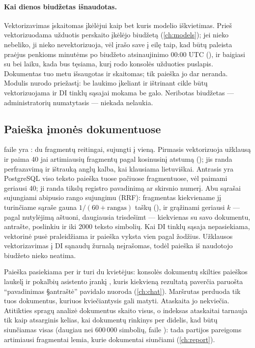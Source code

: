\paragraph{Kai dienos biudžetas išnaudotas.} Vektorizavimas įskaitomas įkėlėjui kaip bet kuris
modelio iškvietimas. Prieš vektorizuodama užduotis perskaito įkėlėjo biudžetą
(\cref{ch:models}); jei nieko nebeliko, ji nieko nevektorizuoja, vėl įrašo save į eilę taip,
kad būtų paleista praėjus penkioms minutėms po biudžeto atsinaujinimo 00:00 UTC
(), ir baigiasi su  bei laiku, kada bus tęsiama, kurį rodo konsolės užduoties puslapis.
Dokumentas tuo metu išsaugotas ir skaitomas; tik paieška jo dar neranda. Modulis nurodo
priežastį: be laukimo įkeliant ir ištrinant cikle būtų vektorizuojama ir DI tinklų sąsajai
mokama be galo. Neribotas biudžetas --- administratorių numatytasis --- niekada nelaukia.

\subsection{Paieška įmonės dokumentuose}\label{sec:company:search}

 faile  yra : du
fragmentų reitingai, sujungti į vieną. Pirmasis vektorizuoja užklausą ir paima 40 jai
artimiausių fragmentų pagal kosinusinį atstumą (); jis randa perfrazavimą ir
ištrauką anglų kalba, kai klausiama lietuviškai. Antrasis yra PostgreSQL viso teksto paieška tuose
pačiuose fragmentuose, vėl paimami geriausi 40; ji randa tikslų registro pavadinimą ar skirsnio numerį.
Abu sąrašai sujungiami abipusio rango sujungimu (RRF): fragmentas kiekviename jį turinčiame
sąraše gauna $1/(60+\text{rangas})$ taškų (), ir grąžinami geriausi $k$ ---
pagal nutylėjimą aštuoni, daugiausia trisdešimt --- kiekvienas su savo dokumentu, antrašte,
poslinkiu ir iki 2000 teksto simbolių. Kai DI tinklų sąsaja nepasiekiama, vektorinė pusė
praleidžiama ir paieška vyksta vien pagal žodžius. Užklausos vektorizavimas į DI sąnaudų
žurnalą neįrašomas, todėl paieška iš naudotojo biudžeto nieko neatima.

Paieška pasiekiama per  ir turi du kvietėjus: konsolės
dokumentų skilties paieškos laukelį ir pokalbių asistento įrankį
, kuris kiekvieną rezultatą paverčia paruošta
\enquote{pavadinimas §antraštė} pavidalo nuoroda (\cref{ch:chat}). Maršrutas perduoda tik tuos dokumentus, kuriuos
kviečiantysis gali matyti. Ataskaita jo nekviečia. Atitikties spragų analizė dokumentus skaito
visus, o indeksas ataskaitai tarnauja tik kaip atsarginis kelias, kai dokumentų rinkinys per
didelis, kad būtų siunčiamas visas (daugiau nei 600\,000 simbolių,  faile
): tada partijos pareigoms artimiausi fragmentai lemia, kurie
dokumentai siunčiami (\cref{ch:report}).


